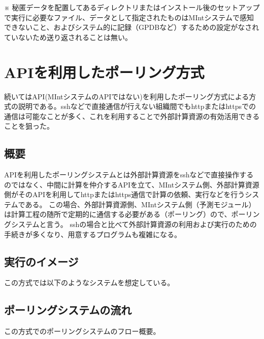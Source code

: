 \documentclass[letterpaper,10pt,dvipdfmx,openany]{sphinxmanual}
\begin{document}
※ 秘匿データを配置してあるディレクトリまたはインストール後のセットアップで実行に必要なファイル、データとして指定されたものはMIntシステムで感知できないこと、およびシステム的に記録（GPDBなど）するための設定がなされていないため送り返されることは無い。

\newpage


\section{APIを利用したポーリング方式}
\label{\detokenize{using_distributed_properties:api}}
続いてはAPI(MIntシステムのAPIではない)を利用したポーリング方式による方式の説明である。sshなどで直接通信が行えない組織間でもhttpまたはhttpsでの通信は可能なことが多く、これを利用することで外部計算資源の有効活用できることを狙った。


\subsection{概要}
\label{\detokenize{using_distributed_properties:id15}}
APIを利用したポーリングシステムとは外部計算資源をsshなどで直接操作するのではなく、中間に計算を仲介するAPIを立て、MIntシステム側、外部計算資源側がそのAPIを利用してhttpまたはhttps通信で計算の依頼、実行などを行うシステムである。
この場合、外部計算資源側、MIntシステム側（予測モジュール）は計算工程の随所で定期的に通信する必要がある（ポーリング）ので、ポーリングシステムと言う。
sshの場合と比べて外部計算資源の利用および実行のための手続きが多くなり、用意するプログラムも複雑になる。

\newpage


\subsection{実行のイメージ}
\label{\detokenize{using_distributed_properties:id16}}
この方式では以下のようなシステムを想定している。

\begin{figure}[htbp]
\centering

\noindent{}
\end{figure}



\newpage


\subsection{ポーリングシステムの流れ}
\label{\detokenize{using_distributed_properties:id17}}
この方式でのポーリングシステムのフロー概要。
\end{document}
